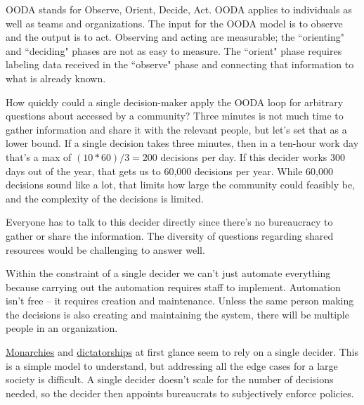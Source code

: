 OODA stands for Observe, Orient, Decide, Act. OODA applies to individuals as well as teams and organizations. 
The input for the OODA model is to observe and the output is to act. Observing and acting are measurable; the ``orienting" and ``deciding" phases are not as easy to measure. The ``orient" phase requires labeling data received in the ``observe" phase and connecting that information to what is already known.

How quickly could a single decision-maker apply the OODA loop for arbitrary questions about \iftoggle{glossarysubstitutionworks}{\glspl{shared resource}}{shared resources} accessed by a community? Three minutes is not much time to gather information and share it with the relevant people, but let's set that as a lower bound.
If a single decision takes three minutes, then in a ten-hour work day that's a max of $(10*60)/3 = 200$ decisions per day. If this decider works 300 days out of the year, that gets us to 60,000 decisions per year. While 60,000 decisions sound like a lot, that limits how large the community could feasibly be, and the complexity of the decisions is limited. 

Everyone has to talk to this decider directly since there's no bureaucracy to gather or share the information. The diversity of questions regarding shared resources would be challenging to answer well.

Within the constraint of a single decider we can't just automate everything because carrying out the automation requires staff to implement. 
Automation isn't free -- it requires creation and maintenance. Unless the same person making the decisions is also creating and maintaining the system, there will be multiple people in an organization.


\href{https://en.wikipedia.org/wiki/Monarchy}{Monarchies} 
\iftoggle{WPinmargin}{\marginpar{$>$Wikipedia: Monarchy}}{} 
and 
\href{https://en.wikipedia.org/wiki/Dictator}{dictatorships}
at first glance seem to rely on a single decider. This is a simple model to understand, but addressing all the edge cases for a large society is difficult. A single decider doesn't scale for the number of decisions needed, so the decider then appoints bureaucrats to subjectively enforce policies. 

